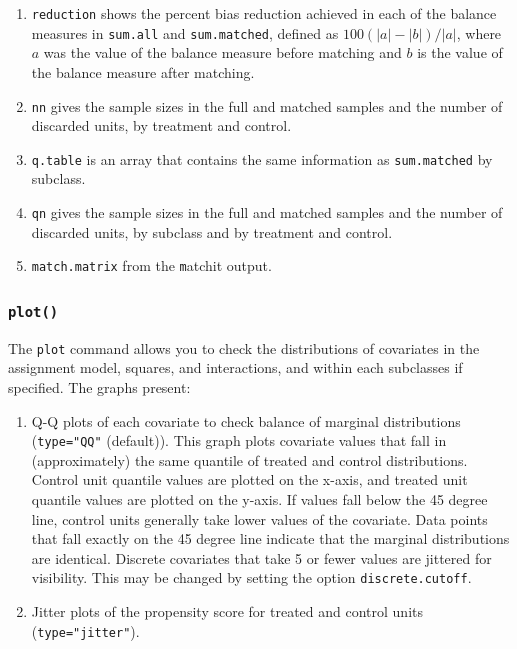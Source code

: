 \documentclass[oneside,letterpaper,titlepage]{article}
\begin{document}
\begin{enumerate}
\item \texttt{reduction} shows the percent bias reduction achieved in
  each of the balance measures in \texttt{sum.all} and
  \texttt{sum.matched}, defined as $100(|a|-|b|)/|a|$, where $a$ was
  the value of the balance measure before matching and $b$ is the
  value of the balance measure after matching.

\item \texttt{nn} gives the sample sizes in the full and matched
  samples and the number of discarded units, by treatment and control.
  
\item \texttt{q.table} is an array that contains the same information
  as \texttt{sum.matched} by subclass.
  
\item \texttt{qn} gives the sample sizes in the full and matched
  samples and the number of discarded units, by subclass and by
  treatment and control.
\item \texttt{match.matrix} from the {\texttt matchit} output.
\end{enumerate}

\subsubsection{{\tt plot()}}

The \texttt{plot} command allows you to check the distributions of
covariates in the assignment model, squares, and interactions, and
within each subclasses if specified.  The graphs present:
\begin{enumerate}
\item Q-Q plots of each covariate to check balance of marginal
  distributions (\texttt{type="QQ"} (default)).  This graph plots
  covariate values that fall in (approximately) the same quantile of
  treated and control distributions.  Control unit quantile values are
  plotted on the x-axis, and treated unit quantile values are plotted
  on the y-axis.  If values fall below the 45 degree line, control
  units generally take lower values of the covariate.  Data points
  that fall exactly on the 45 degree line indicate that the marginal
  distributions are identical.  Discrete covariates that take 5 or
  fewer values are jittered for visibility.  This may be changed by
  setting the option \texttt{discrete.cutoff}.
\item Jitter plots of the propensity score for treated and control
  units (\texttt{type="jitter"}).
\end{enumerate}
\end{document}
